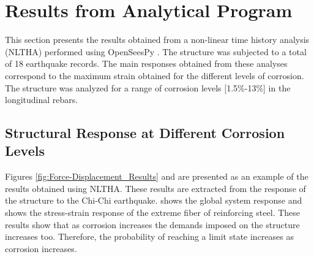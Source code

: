 %
%
\section{Results from Analytical Program}
This section presents the results obtained from a non-linear time history analysis (NLTHA) performed using OpenSeesPy \cite{Zhu2018}. The structure was subjected to a total of 18 earthquake records. The main responses obtained from these analyses correspond to the maximum strain obtained for the different levels of corrosion. The structure was analyzed for a range of corrosion levels [1.5\%-13\%] in the longitudinal rebars.

\subsection{Structural Response at Different Corrosion Levels}
Figures \ref{fig:Force-Displacement_Results} and  are presented as an example of the results obtained using NLTHA. These results are extracted from the response of the structure to the Chi-Chi earthquake.  shows the global system response and  shows the stress-strain response of the extreme fiber of reinforcing steel. These results show that as corrosion increases the demands imposed on the structure increases too. Therefore, the probability of reaching a limit state increases as corrosion increases.

